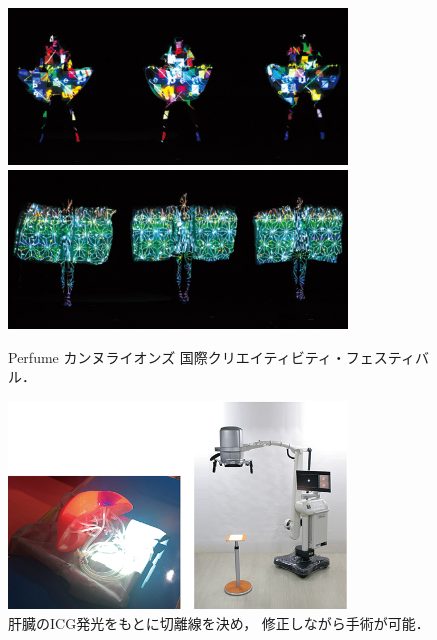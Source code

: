 \begin{figure}[t]
    \centering
    \includegraphics[width=9cm]{image/perfume1.png}
    \includegraphics[width=9cm]{image/perfume2.png}
    \caption[Perfume カンヌライオンズ 国際クリエイティビティ・フェスティバル]{Perfume カンヌライオンズ 
    \protect\linebreak 国際クリエイティビティ・フェスティバル\cite{kirameku}．}
  \label{perfume}
\end{figure}



\begin{figure}[b]
  \centering
  \includegraphics[width=9cm]{image/syujutsu.png}
  \caption[肝臓のICG発光をもとに切離線を決め，修正しながら手術が可能]{肝臓のICG発光をもとに切離線を決め，
  \protect\linebreak 修正しながら手術が可能\cite{iryou}．}
\label{syujutsu}
\end{figure}

